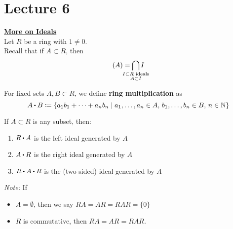 \documentclass[../Main.tex]{subfiles}
\begin{document}
\chapter{Lecture 6}
\underline{\textbf{\Large More on Ideals}}~\\
Let $R$ be a ring with $1\ne 0$.\\
Recall that if $A\subset R$, then
	\[(A)= \bigcap_{\mathclap{\substack{I \subset R \text{ ideals}\\A\subset I} } } I\]
\begin{dfn}[title= Ring Multiplication]
	For fixed sets $A,B \subset R$, we define \textbf{ring multiplication} as
	\[A\rdot B \coloneqq \{a_1b_1 + \dots + a_nb_n \mid a_1,\dots, a_n \in A,\, b_1, \dots, b_n \in B,\, n\in \N\}\]
\end{dfn}
\begin{prop}
	If $A\subset R$ is any subset, then:
	\begin{enumerate}
		\item $R\rdot A$ is the left ideal generated by $A$
		\item $A\rdot R $ is the right ideal generated by $A$
		\item $R\rdot A\rdot R$ is the (two-sided) ideal generated by $A$
	\end{enumerate}
\textit{Note:} If
\begin{itemize}
	\item $A=\emptyset$, then we say $RA=AR=RAR=\{0\}$
	\item $R$ is commutative, then $RA=AR=RAR$.
\end{itemize}
\end{prop}
\end{document}
